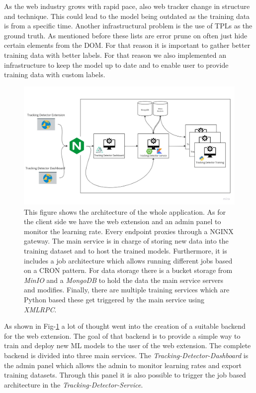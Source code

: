 As the web industry grows with rapid pace, also web tracker change in structure and technique. This could lead to the model being 
outdated as the training data is from a specific time. Another infrastructural problem is the use of TPLs as the ground truth. As mentioned
before these lists are error prune on often just hide certain elements from the DOM. For that reason it is important to gather better 
training data with better labels. For that reason we also implemented an infrastructure to keep the model up to date and to enable user to
provide training data with custom labels.
\begin{figure}
  \begin{center}
    \includegraphics[width=1\textwidth]{images/TrackingDetectorInfra.jpg}
  \end{center}
  \caption{This figure shows the architecture of the whole application. As for the client side we have the web extension and an admin panel to 
  monitor the learning rate. Every endpoint proxies through a NGINX gateway. The main service is in charge of storing new data into the training dataset and 
  to host the trained models. Furthermore, it is includes a job architecture which allows running different jobs based on a CRON pattern. For data storage there is 
  a bucket storage from \emph{MinIO} and a \emph{MongoDB} to hold the data the main service servers and modifies. Finally, there are multiple training services which are Python based
  these get triggered by the main service using \emph{XMLRPC}.
  }
  \label{fig:tdInfra}
\end{figure}

As shown in Fig-\ref{fig:tdInfra} a lot of thought went into the creation of a suitable backend for the web extension. The goal of that
backend is to provide a simple way to train and deploy new ML models to the user of the web extension. The complete backend is divided into
three main services. The \emph{Tracking-Detector-Dashboard} is the admin panel which allows the admin to monitor learning rates and export 
training datasets. Through this panel it is also possible to trigger the job based architecture in the \emph{Tracking-Detector-Service}.

